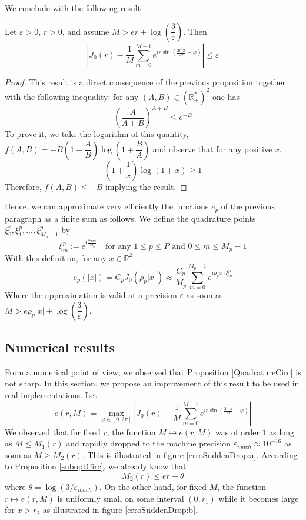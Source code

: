 \documentclass[11pt,a4paper]{article}
\begin{document}
We conclude with the following result
\begin{Prop} Let $\varepsilon >0$, $r>0$, and assume $M > er + \log\left(\dfrac{3}{\varepsilon}\right)$. Then 
\[\left|J_0(r) -  \dfrac{1}{M}\sum_{m=0}^{M-1}e^{ir\sin\left(\frac{2m\pi}{M}-\varphi\right)} \right| \leq \varepsilon \]
\label{suboptCirc}
\begin{proof}
This result is a direct consequence of the previous proposition together with the following inequality: for any $(A,B) \in \left(\mathbb{R}_+^*\right)^2$ one has
\[ \left( \dfrac{A}{A+B}\right)^{A+B} \leq e^{-B}\]
To prove it, we take the logarithm of this quantity, $f(A,B) = -B\left(1+\dfrac{A}{B}\right)\log\left(1+\dfrac{B}{A}\right)$ and observe that for any positive $x$, \[\left(1+\dfrac{1}{x}\right)\log(1+x) \geq 1\]
Therefore, $f(A,B) \leq -B$ implying the result.  
\end{proof}
\end{Prop}

Hence, we can approximate very efficiently the functions $e_p$ of the previous paragraph as a finite sum as follows. We define the quadrature points $\xi_0^p, \xi_1^p, ..., \xi^p_{M_p-1}$  by
\begin{equation}
\label{defXimp}
\xi_m^p := \displaystyle e^{i\frac{2\pi m}{M_p}} \quad \text{for any } 1\leq p \leq P  \text{ and } 0 \leq m \leq M_p -1
\end{equation}
With this definition, for any $x \in \mathbb{R}^2$
\[ e_p(|x|) = C_p J_0(\rho_p |x|)\approx \dfrac{C_p}{M_p}\sum_{m=0}^{M_p-1}{e^{i \rho_px \cdot \xi_m^p}}\]
Where the approximation is valid at a precision $\varepsilon$ as soon as $M > e\rho_p|x| + \log\left(\dfrac{3}{\varepsilon}\right)$. 

\subsection{Numerical results}

From a numerical point of view, we observed that Proposition \ref{QuadratureCirc} is not sharp. In this section, we propose an improvement of this result to be used in real implementations. Let
\[e(r,M) = \max_{\varphi\in [0,2\pi]}\left|J_0(r) -  \dfrac{1}{M}\sum_{m=0}^{M-1}e^{ir\sin\left(\frac{2m\pi}{M}-\varphi\right)} \right|\]
We observed that for fixed $r$, the function $M \mapsto e(r,M)$ was of order $1$ as long as $M \leq M_1(r)$ and rapidly dropped to the machine precision $\varepsilon_{mach} \approx 10^{-16}$ as soon as $M \geq M_2(r)$. This is illustrated in figure \ref{erroSuddenDrop:a}. According to Proposition \ref{suboptCirc}, we already know that \[M_2(r) \leq er + \theta\] where $\theta = \log(3/\varepsilon_{mach})$. On the other hand, for fixed $M$, the function $r \mapsto e(r,M)$ is uniformly small on some interval $(0,r_1)$ while it becomes large for $x > r_2$ as illustrated in figure \ref{erroSuddenDrop:b}. 
\end{document}

